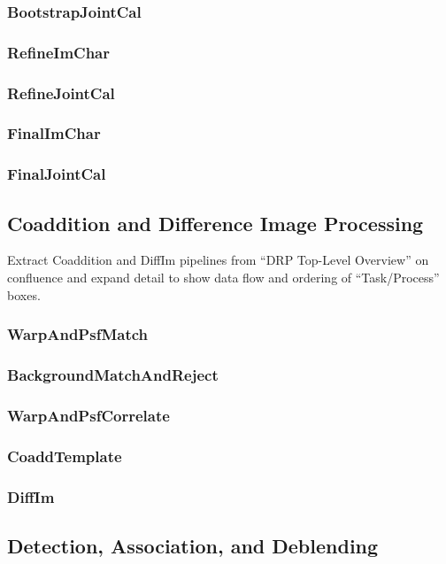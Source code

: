 \subsubsection{BootstrapJointCal}
\subsubsection{RefineImChar}
\subsubsection{RefineJointCal}
\subsubsection{FinalImChar}
\subsubsection{FinalJointCal}

\subsection{Coaddition and Difference Image Processing}

\begin{note}
Extract Coaddition and DiffIm pipelines from ``DRP Top-Level Overview'' on confluence and expand detail to show data flow and ordering of ``Task/Process'' boxes.
\end{note}

\subsubsection{WarpAndPsfMatch}
\subsubsection{BackgroundMatchAndReject}
\subsubsection{WarpAndPsfCorrelate}
\subsubsection{CoaddTemplate}
\subsubsection{DiffIm}

\subsection{Detection, Association, and Deblending}

